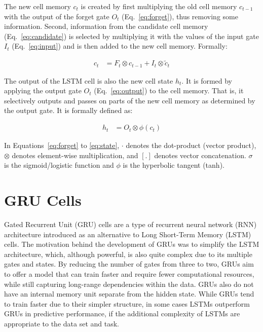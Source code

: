 The new cell memory $c_t$ is created by first multiplying the old cell memory $c_{t-1}$ with the output of the forget gate $O_t$ (Eq.~\ref{eq:forget}), thus removing some information. Second, information from the candidate cell memory (Eq.~\ref{eq:candidate}) is selected by multiplying it with the values of the input gate $I_t$ (Eq.~\ref{eq:input}) and is then added to the new cell memory. Formally:

\begin{align}
c_t &= F_t \otimes c_{t-1} + I_t \otimes \tilde{c}_t \label{eq:memory}
\end{align}

The output of the LSTM cell is also the new cell state $h_t$. It is formed by applying the output gate $O_t$ (Eq.~\ref{eq:output}) to the cell memory. That is, it selectively outputs and passes on parts of the new cell memory as determined by the output gate. It is formally defined as:

\begin{align}
h_t &= O_t \otimes \phi(c_t) \label{eq:state}
\end{align}

In Equations~\ref{eq:forget} to \ref{eq:state}, $\cdot$ denotes the dot-product (vector product), $\otimes$ denotes element-wise multiplication, and $[.]$ denotes vector concatenation. $\sigma$ is the sigmoid/logistic function and $\phi$ is the hyperbolic tangent (tanh).

\section{GRU Cells}

Gated Recurrent Unit (GRU) cells are a type of recurrent neural network (RNN) architecture introduced as an alternative to Long Short-Term Memory (LSTM) cells. The motivation behind the development of GRUs was to simplify the LSTM architecture, which, although powerful, is also quite complex due to its multiple gates and states. By reducing the number of gates from three to two, GRUs aim to offer a model that can train faster and require fewer computational resources, while still capturing long-range dependencies within the data. GRUs also do not have an internal memory unit separate from the hidden state. While GRUs tend to train faster due to their simpler structure, in some cases LSTMs outperform GRUs in predictive performance, if the additional complexity of LSTMs are appropriate to the data set and task.

